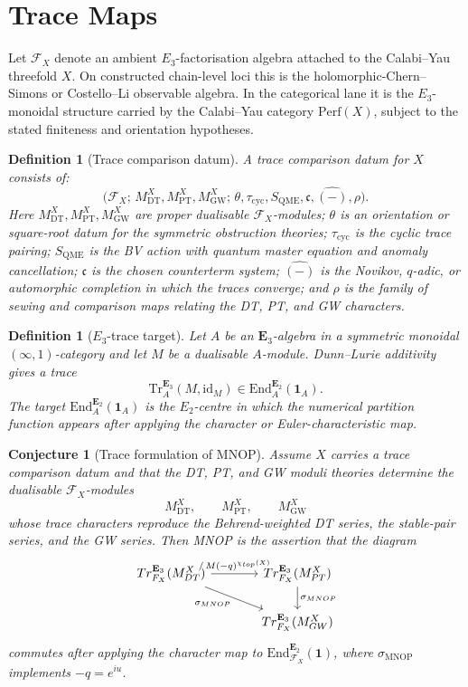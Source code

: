 \documentclass[11pt]{article}
\newtheorem{conjecture}[theorem]{Conjecture}
\newtheorem{definition}[theorem]{Definition}
\providecommand{\cF}{\mathcal{F}}
\providecommand{\Perf}{\mathrm{Perf}}
\providecommand{\DT}{\mathrm{DT}}
\providecommand{\GW}{\mathrm{GW}}
\providecommand{\PT}{\mathrm{PT}}
\providecommand{\MNOP}{\mathrm{MNOP}}
\providecommand{\Tr}{\mathrm{Tr}}
\providecommand{\End}{\mathrm{End}}
\providecommand{\id}{\mathrm{id}}
\providecommand{\QME}{\mathrm{QME}}
\providecommand{\Etwo}{E_2}
\providecommand{\Ethree}{E_3}
\providecommand{\bE}{\mathbf{E}}
\begin{document}
\section{Trace Maps}

Let \(\cF_X\) denote an ambient \(\Ethree\)-factorisation algebra
attached to the Calabi--Yau threefold \(X\).  On constructed
chain-level loci this is the holomorphic-Chern--Simons or
Costello--Li observable algebra.  In the categorical lane it is the
\(\Ethree\)-monoidal structure carried by the Calabi--Yau category
\(\Perf(X)\), subject to the stated finiteness and orientation
hypotheses.

\begin{definition}[Trace comparison datum]
A trace comparison datum for \(X\) consists of:
\[
  \bigl(\cF_X;\,
  M_{\DT}^X,M_{\PT}^X,M_{\GW}^X;\,
  \theta,\tau_{\mathrm{cyc}},S_{\QME},\mathfrak c,\widehat{(-)},\rho\bigr).
\]
Here \(M_{\DT}^X,M_{\PT}^X,M_{\GW}^X\) are proper dualisable
\(\cF_X\)-modules; \(\theta\) is an orientation or square-root datum for
the symmetric obstruction theories; \(\tau_{\mathrm{cyc}}\) is the
cyclic trace pairing; \(S_{\QME}\) is the BV action with quantum master
equation and anomaly cancellation; \(\mathfrak c\) is the chosen
counterterm system; \(\widehat{(-)}\) is the Novikov, \(q\)-adic, or
automorphic completion in which the traces converge; and \(\rho\) is
the family of sewing and comparison maps relating the DT, PT, and GW
characters.
\end{definition}

\begin{definition}[\(\Ethree\)-trace target]
Let \(A\) be an \(\bE_3\)-algebra in a symmetric monoidal
\((\infty,1)\)-category and let \(M\) be a dualisable \(A\)-module.
Dunn--Lurie additivity gives a trace
\[
  \Tr_A^{\bE_3}(M,\id_M)
  \in
  \End_A^{\bE_2}(\mathbf 1_A).
\]
The target \(\End_A^{\bE_2}(\mathbf 1_A)\) is the \(\Etwo\)-centre
in which the numerical partition function appears after applying the
character or Euler-characteristic map.
\end{definition}

\begin{conjecture}[Trace formulation of MNOP]
Assume \(X\) carries a trace comparison datum and that the DT, PT, and
GW moduli theories determine the dualisable \(\cF_X\)-modules
\[
  M_{\DT}^X,\qquad M_{\PT}^X,\qquad M_{\GW}^X
\]
whose trace characters reproduce the Behrend-weighted DT series, the
stable-pair series, and the GW series.  Then MNOP is the assertion
that the diagram
\[
\begin{tikzcd}[column sep=large]
  \Tr_{\cF_X}^{\bE_3}(M_{\DT}^X)
    \arrow[r, "{/\,M(-q)^{\chi_{\mathrm{top}}(X)}}"]
    \arrow[dr, "\sigma_{\MNOP}"']
  &
  \Tr_{\cF_X}^{\bE_3}(M_{\PT}^X)
    \arrow[d, "\sigma_{\MNOP}"]
  \\
  &
  \Tr_{\cF_X}^{\bE_3}(M_{\GW}^X)
\end{tikzcd}
\]
commutes after applying the character map to
\(\End_{\cF_X}^{\bE_2}(\mathbf 1)\), where
\(\sigma_{\MNOP}\) implements \(-q=e^{iu}\).
\end{conjecture}
\end{document}
